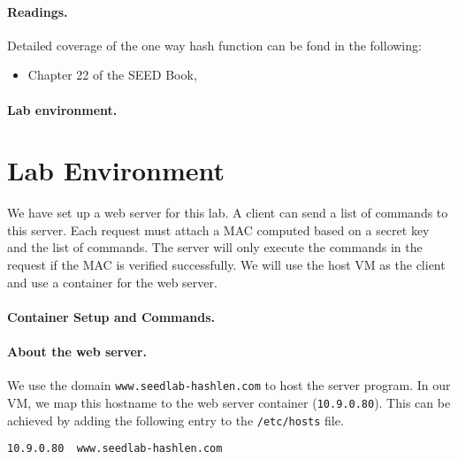 \paragraph{Readings.} Detailed coverage of the one way hash function can be 
fond in the following: 

\begin{itemize}
\item Chapter 22 of the SEED Book, \seedbook
\end{itemize}


\paragraph{Lab environment.} \seedenvironmentB




\section{Lab Environment}

We have set up a web server for this lab. 
A client can send a list of commands to this server. 
Each request must attach a MAC computed based on a secret
key and the list of commands. The server will 
only execute the commands in the request if 
the MAC is verified successfully. 
We will use the host VM as the client and use 
a container for the web server.


\paragraph{Container Setup and Commands.}




\paragraph{About the web server.}
We use the domain \texttt{www.seedlab-hashlen.com} to host the server program. 
In our VM, we map this hostname to 
the web server container (\texttt{10.9.0.80}). This can be
achieved by adding the following entry to the 
\texttt{/etc/hosts} file.

\begin{lstlisting}
10.9.0.80  www.seedlab-hashlen.com
\end{lstlisting}


